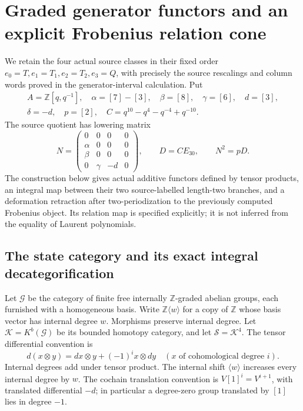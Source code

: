\section{Graded generator functors and an explicit Frobenius relation cone}
\label{sec:fgb}

We retain the four actual source classes in their fixed order
\(e_0=T,e_1=T_1,e_2=T_2,e_3=Q\), with precisely the source rescalings
and column words proved in the generator-interval calculation. Put
\[
 \begin{gathered}
 A=\mathbb Z[q,q^{-1}],\quad
 \alpha=[7]-[3],\quad\beta=[8],\quad\gamma=[6],\quad d=[3],\\
 \delta=-d,\quad p=[2],\quad C=q^{10}-q^4-q^{-4}+q^{-10}.
 \end{gathered}
\]
The source quotient has lowering matrix
\[
 N=\begin{pmatrix}0&0&0&0\\\alpha&0&0&0\\
 \beta&0&0&0\\0&\gamma&-d&0\end{pmatrix},\qquad
 D=CE_{30},\qquad N^2=pD.
\]
The construction below gives actual additive functors defined by tensor
products, an integral map
between their two source-labelled length-two branches, and a deformation
retraction after two-periodization to the previously computed Frobenius
object. Its relation map is specified explicitly; it is not inferred from
the equality of Laurent polynomials.

\subsection{The state category and its exact integral decategorification}

Let \(\mathcal G\) be the category of finite free internally
\(\mathbb Z\)-graded abelian groups, each furnished with a homogeneous
basis. Write \(\mathbb Z\langle w\rangle\) for a copy of \(\mathbb Z\)
whose basis vector has internal degree \(w\). Morphisms preserve internal
degree. Let \(\mathcal K=K^b(\mathcal G)\) be its bounded homotopy category,
and let \(\mathcal S=\mathcal K^4\). The tensor differential convention is
\[
 d(x\otimes y)=dx\otimes y+(-1)^i x\otimes dy
 \quad(x\text{ of cohomological degree }i).
\]
Internal degrees add under tensor product. The internal shift
\(\langle w\rangle\) increases every internal degree by \(w\).
The cochain translation convention is \(V[1]^i=V^{i+1}\), with
translated differential \(-d\); in particular a degree-zero group
translated by \([1]\) lies in degree \(-1\).

